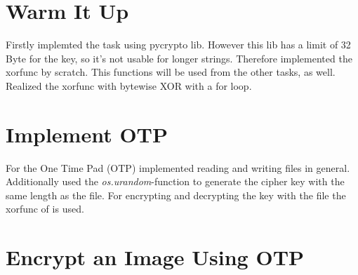 \section{Warm It Up}


Firstly implemted the task using pycrypto lib. However this lib has a limit of 32 Byte for the key, so it's not usable for longer strings. Therefore implemented the xorfunc by scratch. This functions will be used from the other tasks, as well. Realized the xorfunc with bytewise XOR with a for loop.\\


\section{Implement OTP}


For the One Time Pad (OTP) implemented reading and writing files in general. Additionally used the \textit{os.urandom}-function to generate the cipher key with the same length as the file. For encrypting and decrypting the key with the file the xorfunc of  is used.\\

\section{Encrypt an Image Using OTP}




